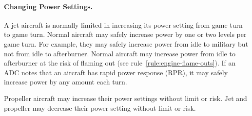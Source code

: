 \begin{advancedrules}
\paragraph{Changing Power Settings.}\label{rule:rapid-power-response} A jet aircraft is normally limited in increasing its power setting from game turn to game turn. Normal aircraft may safely increase power by one or two levels per game turn. For example, they may safely increase power from idle to military but not from idle to afterburner. Normal aircraft may increase power from idle to afterburner at the risk of flaming out (see rule~\ref{rule:engine-flame-outs}). If an ADC notes that an aircraft has rapid power response (RPR), it may safely increase power by any amount each turn. 

Propeller aircraft may increase their power settings without limit or risk. Jet and propeller may decrease their power setting without limit or risk. 

\end{advancedrules}
